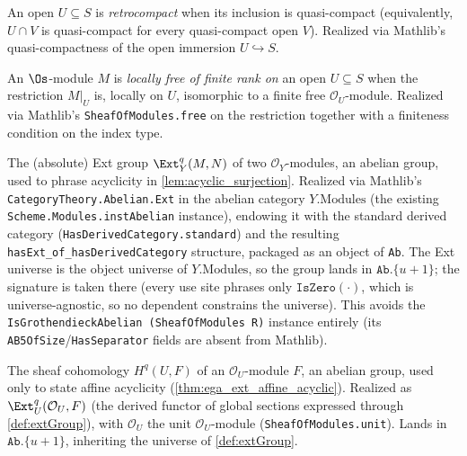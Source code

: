 \begin{definition}
  \label{def:isRetrocompact}
  An open $U \subseteq S$ is \emph{retrocompact} when its inclusion is
  quasi-compact (equivalently, $U \cap V$ is quasi-compact for every
  quasi-compact open $V$). Realized via Mathlib's quasi-compactness of the open
  immersion $U \hookrightarrow S$.
\end{definition}

\begin{definition}
  \label{def:isLocallyFreeOfFiniteRankOn}
  An $\Os$-module $M$ is \emph{locally free of finite rank on} an open
  $U \subseteq S$ when the restriction $M|_U$ is, locally on $U$, isomorphic to a
  finite free $\mathcal{O}_U$-module. Realized via Mathlib's
  \texttt{SheafOfModules.free} on the restriction together with a finiteness
  condition on the index type.
\end{definition}

\begin{definition}\leanok
  \label{def:extGroup}
  The (absolute) Ext group $\Ext^q_Y(M,N)$ of two $\mathcal{O}_Y$-modules, an
  abelian group, used to phrase acyclicity in \cref{lem:acyclic_surjection}.
  Realized via Mathlib's \texttt{CategoryTheory.Abelian.Ext} in the abelian
  category $Y.\mathrm{Modules}$ (the existing \texttt{Scheme.Modules.instAbelian}
  instance), endowing it with the standard derived category
  (\texttt{HasDerivedCategory.standard}) and the resulting
  \texttt{hasExt\_of\_hasDerivedCategory} structure, packaged as an object of
  \texttt{Ab}. The Ext universe is the object universe of $Y.\mathrm{Modules}$,
  so the group lands in $\mathtt{Ab}.\{u{+}1\}$; the signature is taken there
  (every use site phrases only $\mathtt{IsZero}(\cdot)$, which is
  universe-agnostic, so no dependent constrains the universe). This avoids the
  \texttt{IsGrothendieckAbelian (SheafOfModules R)} instance entirely (its
  \texttt{AB5OfSize}/\texttt{HasSeparator} fields are absent from Mathlib).
\end{definition}

\begin{definition}\leanok
  \label{def:sheafCohomology}
  The sheaf cohomology $H^q(U,F)$ of an $\mathcal{O}_U$-module $F$, an abelian
  group, used only to state affine acyclicity (\cref{thm:ega_ext_affine_acyclic}).
  Realized as $\Ext^q_U(\mathcal{O}_U, F)$ (the derived functor of global sections
  expressed through \cref{def:extGroup}), with $\mathcal{O}_U$ the unit
  $\mathcal{O}_U$-module (\texttt{SheafOfModules.unit}). Lands in
  $\mathtt{Ab}.\{u{+}1\}$, inheriting the universe of \cref{def:extGroup}.
\end{definition}

